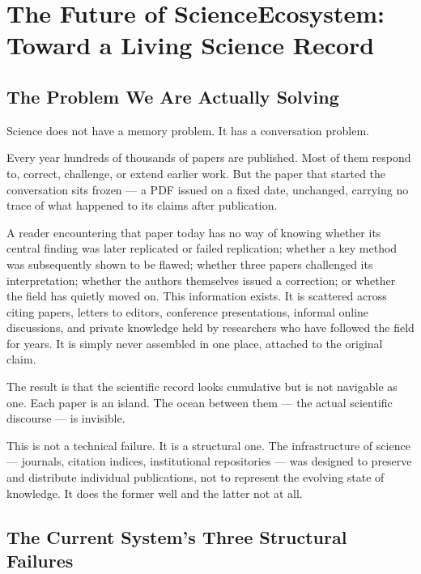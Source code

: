 
\section*{The Future of ScienceEcosystem: Toward a Living Science Record}

\subsection*{The Problem We Are Actually Solving}

Science does not have a memory problem. It has a conversation problem.

Every year hundreds of thousands of papers are published. Most of them respond
to, correct, challenge, or extend earlier work. But the paper that started the
conversation sits frozen — a PDF issued on a fixed date, unchanged, carrying no
trace of what happened to its claims after publication.

A reader encountering that paper today has no way of knowing whether its central
finding was later replicated or failed replication; whether a key method was
subsequently shown to be flawed; whether three papers challenged its
interpretation; whether the authors themselves issued a correction; or whether
the field has quietly moved on. This information exists. It is scattered across
citing papers, letters to editors, conference presentations, informal online
discussions, and private knowledge held by researchers who have followed the
field for years. It is simply never assembled in one place, attached to the
original claim.

The result is that the scientific record looks cumulative but is not navigable
as one. Each paper is an island. The ocean between them — the actual scientific
discourse — is invisible.

This is not a technical failure. It is a structural one. The infrastructure of
science — journals, citation indices, institutional repositories — was designed
to preserve and distribute individual publications, not to represent the
evolving state of knowledge. It does the former well and the latter not at all.

\subsection*{The Current System's Three Structural Failures}

